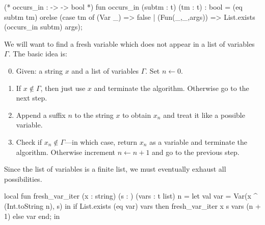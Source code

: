 \nwenddocs{}\endmoddef\nwstartdeflinemarkup{}\nwenddeflinemarkup
(* occurs_in :  ->  -> bool *)
fun occurs_in (subtm : t) (tm : t) : bool =
  (eq subtm tm) orelse
  (case tm of
    (Var _) => false
  | (Fun(_,_,args)) => List.exists (occurs_in subtm) args);
\eatline
{}\nwendcode{}\nwdocspar
\begin{node}
We will want to find a fresh variable which does not appear in a list
of variables $\Gamma$. The basic idea is:
\begin{enumerate}\setcounter{enumi}{-1}
\item Given: a string $x$ and a list of variables $\Gamma$. Set
  $n\gets 0$.
\item If $x\notin\Gamma$, then just use $x$ and terminate the
  algorithm. Otherwise go to the next step.
\item Append a suffix $n$ to the string $x$ to obtain $x_{n}$ and
  treat it like a  possible variable.
\item Check if $x_{n}\notin\Gamma$---in which case, return $x_{n}$ as a
  variable and terminate the algorithm. Otherwise increment $n\gets n+1$
  and go to the previous step.
\end{enumerate}
Since the list of variables is a finite list, we must eventually
exhaust all possibilities.
\end{node}

\nwenddocs{}\endmoddef\nwstartdeflinemarkup{}\nwenddeflinemarkup
local
  fun fresh_var_iter (x : string) (s : ) (vars : t list) n = 
    let val var = Var(x ^ (Int.toString n), s)
    in if List.exists (eq var) vars
       then fresh_var_iter x s vars (n + 1)
       else var
    end;
in

